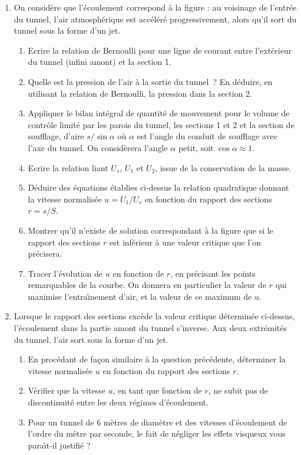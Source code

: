 \begin{enumerate}

\item 
  On consid\`ere que l'\'ecoulement correspond \`a la figure : 
  au voisinage de l'entr\'ee du tunnel, l'air atmosph\'erique est acc\'el\'er\'e progressivement, 
  alors qu'il sort du tunnel sous la forme d'un jet.
  \begin{enumerate}
  \item 
    Ecrire la relation de Bernoulli pour une ligne de courant entre l'ext\'erieur du tunnel 
    (infini amont) et la section 1.
  \item 
    Quelle est la pression de l'air \`a la sortie du tunnel~? 
    En d\'eduire, en utilisant la relation de Bernoulli, la pression dans la section 2.
  \item 
    Appliquer le bilan int\'egral de quantit\'e de mouvement pour 
    le volume de contr\^ole limit\'e par les parois du tunnel, les sections 1 et 2 et 
    la section de soufflage, d'aire $s/\sin \alpha$ o\`u $\alpha$ est l'angle du conduit 
    de soufflage avec l'axe du tunnel. 
    On consid\`erera l'angle $\alpha$ petit, soit $\cos \alpha \approx 1$.
  \item 
    Ecrire la relation liant $U_s$, $U_1$ et $U_2$, issue de la conservation de la masse.
  \item 
    D\'eduire des \'equations \'etablies ci-dessus la relation quadratique donnant 
    la vitesse normalis\'ee $u = U_1/U_s$ en fonction du rapport des sections $r = s/S$. 
  \item 
    Montrer qu'il n'existe de solution correspondant \`a la figure que si le rapport des 
    sections $r$ est inf\'erieur \`a une valeur critique que l'on pr\'ecisera.
  \item 
    Tracer l'\'evolution de $u$ en fonction de $r$, en pr\'ecisant les points remarquables 
    de la courbe. On donnera en particulier la valeur de $r$ qui maximise l'entra\^{\i}nement 
    d'air, et la valeur de ce maximum de $u$.
  \end{enumerate}
  
\item 
  Lorsque le rapport des sections exc\`ede la valeur critique d\'etermin\'ee ci-dessus, 
  l'\'ecoulement dans la partie amont du tunnel s'inverse. 
  Aux deux extr\'emit\'es du tunnel, l'air sort sous la forme d'un jet.
  \begin{enumerate}
  \item 
    En proc\'edant de fa\c{c}on similaire \`a la question pr\'ec\'edente, 
    d\'eterminer la vitesse normalis\'ee $u$ en fonction du rapport des sections $r$.
  \item 
    V\'erifier que la vitesse $u$, en tant que fonction de $r$, ne subit pas de discontinuit\'e 
    entre les deux r\'egimes d'\'ecoulement.
  \item 
    Pour un tunnel de 6 m\`etres de diam\`etre et des vitesses d'\'ecoulement de l'ordre 
    du m\`etre par seconde, le fait de n\'egliger les effets visqueux vous para\^{\i}t-il 
    justifi\'e ?
  \end{enumerate}
  
\end{enumerate}
